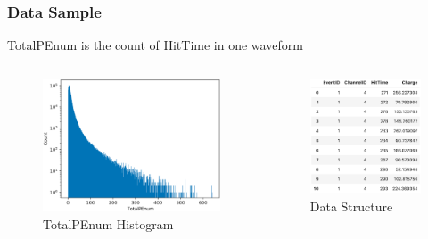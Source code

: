 \documentclass{beamer}
\begin{document}
\begin{frame}
\frametitle{Data Sample}
TotalPEnum is the count of HitTime in one waveform
\begin{columns}
\begin{figure}
    \centering
    \caption{TotalPEnum Histogram}
    \includegraphics[width=1.0\linewidth]{img/penum.png}
\end{figure}
\begin{figure}
    \centering
    \caption{Data Structure}
    \includegraphics[width=1.0\linewidth]{img/dataset.png}
\end{figure}
\end{columns}
\end{frame}
\end{document}

